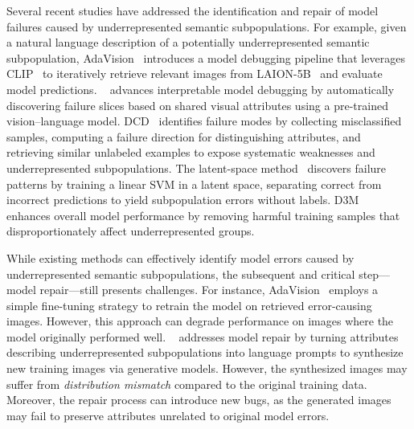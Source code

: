 Several recent studies have addressed the identification and repair of model failures caused by underrepresented semantic subpopulations. For example, given a natural language description of a potentially underrepresented semantic subpopulation, AdaVision~\cite{gao2023adaptive} introduces a model debugging pipeline that leverages CLIP~\cite{radford2021learning} to iteratively retrieve relevant images from LAION-5B~\cite{schuhmann2022laion} and evaluate model predictions. \safefix~\cite{chen2023safefix} advances interpretable model debugging by automatically discovering failure slices based on shared visual attributes using a pre-trained vision--language model. DCD~\cite{singla2024data} identifies failure modes by collecting misclassified samples, computing a failure direction for distinguishing attributes, and retrieving similar unlabeled examples to expose systematic weaknesses and underrepresented subpopulations.
The latent-space method~\cite{jain2023latentfailures} discovers failure patterns by training a linear SVM in a  latent space, separating correct from incorrect predictions to yield subpopulation errors without labels.
D3M~\cite{jain2023d3m} enhances overall model performance by removing harmful training samples that disproportionately affect underrepresented groups.

While existing methods can effectively identify model errors caused by underrepresented semantic subpopulations, the subsequent and critical step—model repair—still presents challenges. For instance, AdaVision~\cite{gao2023adaptive} employs a simple fine-tuning strategy to retrain the model on retrieved error-causing images.
However, this approach can degrade performance on images where the model originally performed well. \safefix~\cite{chen2023safefix} addresses model repair by turning attributes describing underrepresented subpopulations into language prompts to synthesize new training images via generative models. However, the synthesized images may suffer from \emph{distribution mismatch} compared to the original training data. Moreover, the repair process can introduce new bugs, as the generated images may fail to preserve attributes unrelated to original model errors.


